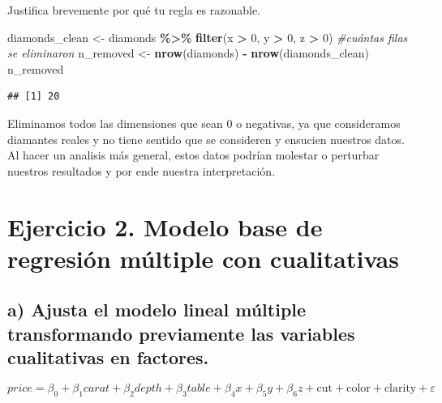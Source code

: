 \documentclass[
  spanish,
]{article}
\newenvironment{Shaded}{\begin{snugshade}}{\end{snugshade}}
\newcommand{\CommentTok}[1]{\textcolor[rgb]{0.56,0.35,0.01}{\textit{#1}}}
\newcommand{\DecValTok}[1]{\textcolor[rgb]{0.00,0.00,0.81}{#1}}
\newcommand{\FunctionTok}[1]{\textcolor[rgb]{0.13,0.29,0.53}{\textbf{#1}}}
\newcommand{\NormalTok}[1]{#1}
\newcommand{\OtherTok}[1]{\textcolor[rgb]{0.56,0.35,0.01}{#1}}
\newcommand{\SpecialCharTok}[1]{\textcolor[rgb]{0.81,0.36,0.00}{\textbf{#1}}}
\begin{document}
Justifica brevemente por qué tu regla es razonable.

\begin{Shaded}
\begin{Highlighting}[]
\NormalTok{diamonds\_clean }\OtherTok{\textless{}{-}}\NormalTok{ diamonds }\SpecialCharTok{\%\textgreater{}\%} \FunctionTok{filter}\NormalTok{(x }\SpecialCharTok{\textgreater{}} \DecValTok{0}\NormalTok{, y }\SpecialCharTok{\textgreater{}} \DecValTok{0}\NormalTok{, z }\SpecialCharTok{\textgreater{}} \DecValTok{0}\NormalTok{)}
\CommentTok{\#cuántas filas se eliminaron}
\NormalTok{n\_removed }\OtherTok{\textless{}{-}} \FunctionTok{nrow}\NormalTok{(diamonds) }\SpecialCharTok{{-}} \FunctionTok{nrow}\NormalTok{(diamonds\_clean)}
\NormalTok{n\_removed}
\end{Highlighting}
\end{Shaded}

\begin{verbatim}
## [1] 20
\end{verbatim}

Eliminamos todos las dimensiones que sean 0 o negativas, ya que
consideramos diamantes reales y no tiene sentido que se consideren y
ensucien nuestros datos. Al hacer un analisis más general, estos datos
podrían molestar o perturbar nuestros resultados y por ende nuestra
interpretación.

\section*{Ejercicio 2. Modelo base de regresión múltiple con
cualitativas}\label{ejercicio-2.-modelo-base-de-regresiuxf3n-muxfaltiple-con-cualitativas}

\subsection*{a) Ajusta el modelo lineal múltiple transformando
previamente las variables cualitativas en
factores.}\label{a-ajusta-el-modelo-lineal-muxfaltiple-transformando-previamente-las-variables-cualitativas-en-factores.}

\[
price = \beta_0 + \beta_1 carat + \beta_2 depth + \beta_3 table + \beta_4 x + \beta_5 y + \beta_6 z + \text{cut} + \text{color} + \text{clarity} + \varepsilon
\]
\end{document}

